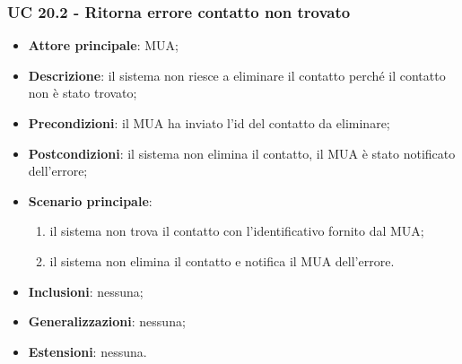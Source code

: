     \subsubsection{UC 20.2 - Ritorna errore contatto non trovato} \label{sec:UC20.2}
    \begin{itemize}
        \item \textbf{Attore principale}: MUA;
        \item \textbf{Descrizione}: il sistema non riesce a eliminare il contatto perché il contatto non è stato trovato;
        \item \textbf{Precondizioni}: il MUA ha inviato l'id del contatto da eliminare;
        \item \textbf{Postcondizioni}: il sistema non elimina il contatto, il MUA è stato notificato dell'errore;
        \item \textbf{Scenario principale}:
            \begin{enumerate}
                \item il sistema non trova il contatto con l'identificativo fornito dal MUA;
                \item il sistema non elimina il contatto e notifica il MUA dell'errore.
            \end{enumerate}
        \item \textbf{Inclusioni}: nessuna;
        \item \textbf{Generalizzazioni}: nessuna;
        \item \textbf{Estensioni}: nessuna.
    \end{itemize}

